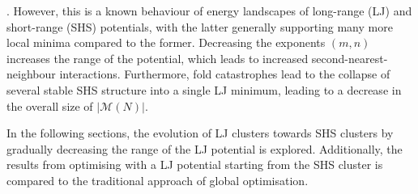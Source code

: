 \autocite{Doye_Evolutionpotentialenergy_1999}. However, this is a known
behaviour of energy landscapes of long-range (\ac{LJ}) and short-range
(\ac{SHS}) potentials, with the latter generally supporting many more local
minima compared to the
former.\autocite{braier90,Wales_MicroscopicBasisGlobal_2001} Decreasing the
exponents $(m,n)$ increases the range of the potential, which leads to increased
second-nearest-neighbour interactions. Furthermore, fold
catastrophes\autocite{Wales_MicroscopicBasisGlobal_2001,Wales_Energylandscapes_2003}
lead to the collapse of several stable \ac{SHS} structure into a single \ac{LJ}
minimum, leading to a decrease in the overall size of $|\mathcal{M}(N)|$.

In the following sections, the evolution of \ac{LJ} clusters towards \ac{SHS}
clusters by gradually decreasing the range of the \ac{LJ} potential is explored.
Additionally, the results from optimising with a \ac{LJ} potential starting from
the \ac{SHS} cluster is compared to the traditional approach of global
optimisation.



